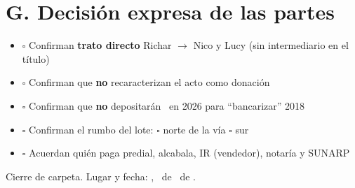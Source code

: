 \documentclass[12pt,a4paper]{article}
\begin{document}
\section*{G. Decisión expresa de las partes}
\begin{itemize}[leftmargin=0.9cm]
\item $\square$ Confirman \textbf{trato directo} Richar $\rightarrow$ Nico y Lucy (sin intermediario en el título)
\item $\square$ Confirman que \textbf{no} recaracterizan el acto como donación
\item $\square$ Confirman que \textbf{no} depositarán \MontoPago\ en 2026 para ``bancarizar'' 2018
\item $\square$ Confirman el rumbo del lote: \quad $\square$ norte de la vía \quad $\square$ sur
\item $\square$ Acuerdan quién paga predial, alcabala, IR (vendedor), notaría y SUNARP
\end{itemize}

\vspace{0.4em}
\noindent Cierre de carpeta. Lugar y fecha: \LugarOtorgamiento, \DiaOtorgamiento\ de \MesOtorgamiento\ de \AnioOtorgamiento.

\vspace{0.2em}
\end{document}
